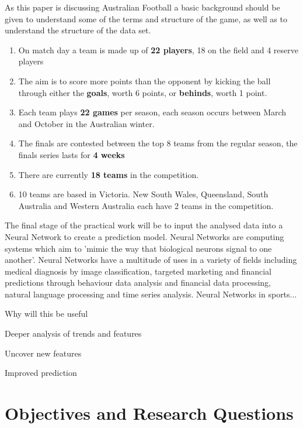 \documentclass{imc-inf}
\begin{document}
	As this paper is discussing Australian Football a basic background should be given to understand some of the terms and structure of the game, as well as to understand the structure of the data set. 
	\begin{enumerate}
		\item On match day a team is made up of \textbf{22 players}, 18 on the field and 4 reserve players
		\item The aim is to score more points than the opponent by kicking the ball through either the \textbf{goals}, worth 6 points, or \textbf{behinds}, worth 1 point.
		\item Each team plays \textbf{22 games} per season, each season occurs between March and October in the Australian winter.
		\item The finals are contested between the top 8 teams from the regular season, the finals series lasts for \textbf{4 weeks}
		\item There are currently \textbf{18 teams} in the competition.
		\item 10 teams are based in Victoria. New South Wales, Queensland, South Australia and Western Australia each have 2 teams in the competition.
	\end{enumerate}
	
	The final stage of the practical work will be to input the analysed data into a Neural Network to create a prediction model. Neural Networks are computing systems which aim to 'mimic the way that biological neurons signal to one another'\cite{website:IBM}. Neural Networks have a multitude of uses in a variety of fields including medical diagnosis by image classification, targeted marketing and financial predictions through behaviour data analysis and financial data processing, natural language processing and time series analysis. 
	Neural Networks in sports...
	\linebreak
	
	Why will this be useful 
	\linebreak
	
	Deeper analysis of trends and features
	\linebreak
	
	Uncover new features
	\linebreak
	
	Improved prediction
	\linebreak
	
	\chapter{Objectives and Research Questions}\label{chap:objectives}
\end{document}
